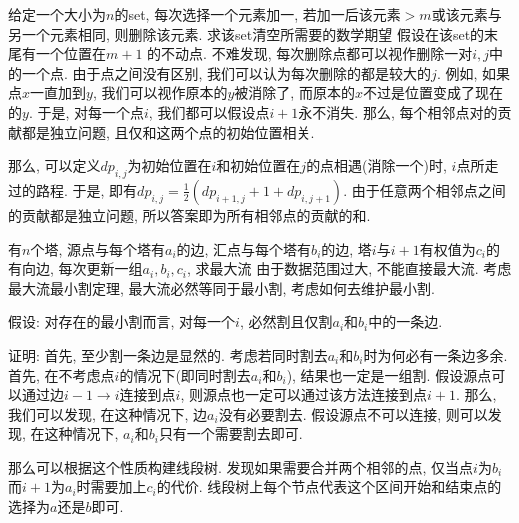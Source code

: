 \prob 给定一个大小为$n$的set, 每次选择一个元素加一, 若加一后该元素$> m$或该元素与另一个元素相同, 则删除该元素. 求该set清空所需要的数学期望
\sol 假设在该set的末尾有一个位置在$m + 1$ 的不动点. 不难发现, 每次删除点都可以视作删除一对$i,j$中的一个点. 由于点之间没有区别, 我们可以认为每次删除的都是较大的$j$. 例如, 如果点$x$一直加到$y$, 我们可以视作原本的$y$被消除了, 而原本的$x$不过是位置变成了现在的$y$. 于是, 对每一个点$i$, 我们都可以假设点$i+1$永不消失. 那么, 每个相邻点对的贡献都是独立问题, 且仅和这两个点的初始位置相关.

那么, 可以定义$dp_{i,j}$为初始位置在$i$和初始位置在$j$的点相遇(消除一个)时, $i$点所走过的路程. 于是, 即有$dp_{i,j} = \frac{1}{2}(dp_{i+1, j} + 1 + dp_{i, j+1})$. 由于任意两个相邻点之间的贡献都是独立问题, 所以答案即为所有相邻点的贡献的和.

\prob 有$n$个塔, 源点与每个塔有$a_i$的边, 汇点与每个塔有$b_i$的边, 塔$i$与$i+1$有权值为$c_i$的有向边, 每次更新一组$a_i, b_i, c_i$, 求最大流
\sol 由于数据范围过大, 不能直接最大流. 考虑最大流最小割定理, 最大流必然等同于最小割, 考虑如何去维护最小割.

假设: 对存在的最小割而言, 对每一个$i$, 必然割且仅割$a_i$和$b_i$中的一条边.

证明: 首先, 至少割一条边是显然的. 考虑若同时割去$a_i$和$b_i$时为何必有一条边多余. 首先, 在不考虑点$i$的情况下(即同时割去$a_i$和$b_i$), 结果也一定是一组割. 假设源点可以通过边$i-1 \to i$连接到点$i$, 则源点也一定可以通过该方法连接到点$i+1$. 那么,  我们可以发现, 在这种情况下, 边$a_i$没有必要割去. 假设源点不可以连接, 则可以发现, 在这种情况下, $a_i$和$b_i$只有一个需要割去即可. 

那么可以根据这个性质构建线段树. 发现如果需要合并两个相邻的点, 仅当点$i$为$b_i$而$i+1$为$a_i$时需要加上$c_i$的代价. 线段树上每个节点代表这个区间开始和结束点的选择为$a$还是$b$即可.